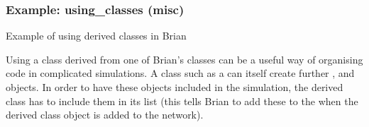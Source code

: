 \documentclass[letterpaper,10pt,english]{manual}
\begin{document}
\resetcurrentobjects
\hypertarget{--doc-examples-misc_using_classes}{}

\hypertarget{index-73}{}\subsubsection{Example: using\_classes (misc)}

Example of using derived classes in Brian

Using a class derived from one of Brian's classes can be a useful way of
organising code in complicated simulations. A class such as a \hyperlink{brian.NeuronGroup}{}
can itself create further \hyperlink{brian.NeuronGroup}{}, \hyperlink{brian.Connection}{} and
\hyperlink{brian.NetworkOperation}{} objects. In order to have these objects included in
the simulation, the derived class has to include them in its 
list (this tells Brian to add these to the \hyperlink{brian.Network}{} when the derived
class object is added to the network).
\end{document}
